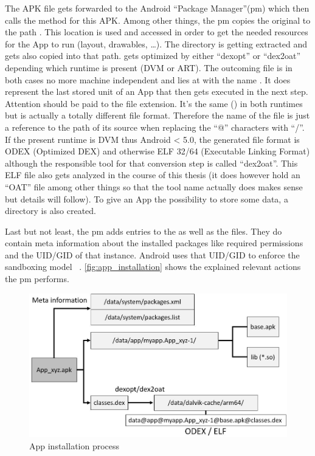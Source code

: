The APK file gets forwarded to the Android ``Package Manager''(pm)
which then calls the  method for this
APK. Among other things, the pm copies the original 
to the path .
This location is used and accessed in order to get the
needed resources for the App to run (layout, drawables, \ldots).
The  directory is getting extracted and gets also copied
into that path.  gets optimized by either ``dexopt''
or ``dex2oat'' depending which runtime is present (DVM or ART).
The outcoming file is in both cases no more machine independent
and lies at  with the name
.
It does represent the last stored unit of an App that then
gets executed in the next step.
Attention should be paid to the file extension.
It's the same () in both runtimes but is actually a totally
different file format.
Therefore the name of the file is just a reference to the path
of its source when replacing the ``@'' characters with ``/''.
If the present runtime is DVM thus Android < 5.0, the generated
file format is ODEX (Optimized DEX) and otherwise
ELF 32/64 (Executable Linking Format) although the responsible
tool for that conversion step is called ``dex2oat''. This ELF
file also gets analyzed in the course of this thesis
(it does however hold an ``OAT'' file among other things so that
the tool name actually does makes sense but details will follow).
To give an App the possibility to
store some data, a  directory is
also created.

Last but not least, the pm adds entries to the
 as well as the
 files. They do contain
meta information about the installed packages like
required permissions and the UID/GID of that instance.
Android uses that UID/GID to enforce the sandboxing model
~\parencite[ch.1]{securityinternals}.
\autoref{fig:app_installation} shows the explained
relevant actions the pm performs.

\begin{figure}[htb]
  \includegraphics[width=\textwidth]{figures/app_installation}
  \caption[App installation process]{App installation process}
  \label{fig:app_installation}
\end{figure}

